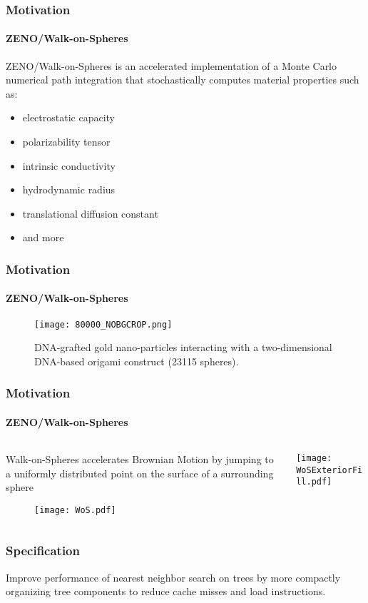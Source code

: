 \begin{frame}
  \frametitle{Motivation}
  \framesubtitle{ZENO/Walk-on-Spheres}

  {\color{white}\Large%
  ZENO/Walk-on-Spheres is an accelerated implementation of a Monte Carlo
    numerical path integration that stochastically computes material properties
    such as:
  }
  \begin{itemize}
      \large%
    \item electrostatic capacity
    \item polarizability tensor
    \item intrinsic conductivity 
    \item hydrodynamic radius
    \item translational diffusion constant
    \item and more
  \end{itemize}
\end{frame}

\begin{frame}
  \frametitle{Motivation}
  \framesubtitle{ZENO/Walk-on-Spheres}

  \begin{figure}
    \centering
    \texttt{[image: 80000\_NOBGCROP.png]}
    \caption{DNA-grafted gold nano-particles interacting with a 
    two-dimensional DNA-based origami construct (23115 spheres).}
    \label{fig:80000}
  \end{figure}
\end{frame}

\begin{frame}
  \frametitle{Motivation}
  \framesubtitle{ZENO/Walk-on-Spheres}

  \begin{columns}[T]
    \begin{column}{.5\textwidth}
      \begin{block}{}%
        {\color{white} Walk-on-Spheres accelerates Brownian Motion by jumping %
          to a uniformly distributed point on the surface of a surrounding sphere}
      \end{block}
      \vspace{-1cm}%
      \begin{block}{}%
        \begin{figure}
          \centering
          \texttt{[image: WoS.pdf]}
        \end{figure}
      \end{block}
    \end{column}
    \begin{column}{.5\textwidth}
      \begin{block}{}%
        \texttt{[image: WoSExteriorFill.pdf]}
      \end{block}
    \end{column}
  \end{columns}
\end{frame}

\begin{frame}
  \frametitle{Specification}

  {\color{white}
  Improve performance of nearest neighbor search on \kd trees by more compactly organizing tree components
  to reduce cache misses and load instructions.}

\end{frame}
